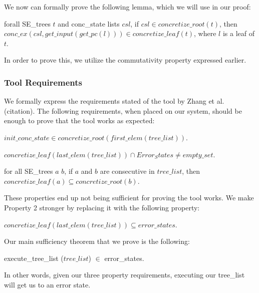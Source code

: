 We now can formally prove the following lemma, which we will use in our proof:
\begin{lemma} \label{cop}
forall SE\_trees $t$ and conc\_state lists $csl$,
if $csl \in concretize\_root(t)$,
then 
$conc\_ex(csl, get\_input (get\_pc (l))) \in concretize\_leaf(t)$,
where $l$ is a leaf of $t$.
\end{lemma}

In order to prove this, we utilize the commutativity property expressed earlier.


\subsubsection{Tool Requirements}
We formally express the requirements stated of the tool by Zhang et al. (citation).
The following requirements, when placed on our system, should be enough to prove that the tool works as expected:
\begin{axiom}[Property $1$]
$init\_conc\_state \in concretize\_root(first\_elem (tree\_list))$.
\end{axiom}

\begin{axiom}[Property $2$]
$ concretize\_leaf (last\_elem (tree\_list)) \cap Error_States 
\neq empty\_set $.
\end{axiom}

\begin{axiom}[Property $3$]
for all SE\_trees $a$ $b$, 
if $a$ and $b$ are consecutive in $tree\_list$, then 
$concretize\_leaf (a) \subseteq
concretize\_root(b) $.
\end{axiom}

These properties end up not being sufficient for proving the tool works. 
We make Property 2 stronger by replacing it with the following property:

\begin{axiom}[Property $2'$]
$concretize\_leaf (last\_elem (tree\_list))
\subseteq error\_states $.
\end{axiom}



Our main sufficiency theorem that we prove is the following:
\begin{theorem}
execute\_tree\_list ($tree\_list$) $\in$ error\_states.
\end{theorem}
 In other words, given our three property requirements, executing our tree\_list will get us to an error state.